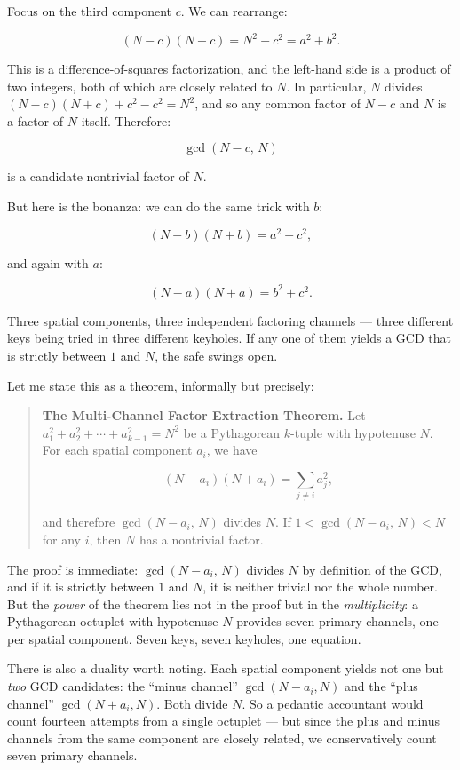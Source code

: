 Focus on the third component \(c\). We can rearrange:

\[(N - c)(N + c) = N^2 - c^2 = a^2 + b^2.\]

This is a difference-of-squares factorization, and the left-hand side is a product of two integers, both of which are closely related to \(N\). In particular, \(N\) divides \((N - c)(N + c) + c^2 - c^2 = N^2\), and so any common factor of \(N - c\) and \(N\) is a factor of \(N\) itself. Therefore:

\[\gcd(N - c, \, N)\]

is a candidate nontrivial factor of \(N\).

But here is the bonanza: we can do the same trick with \(b\):

\[(N - b)(N + b) = a^2 + c^2,\]

and again with \(a\):

\[(N - a)(N + a) = b^2 + c^2.\]

Three spatial components, three independent factoring channels --- three different keys being tried in three different keyholes. If any one of them yields a GCD that is strictly between \(1\) and \(N\), the safe swings open.

Let me state this as a theorem, informally but precisely:

\begin{quote}
\textbf{The Multi-Channel Factor Extraction Theorem.} Let \(a_1^2 + a_2^2 + \cdots + a_{k-1}^2 = N^2\) be a Pythagorean \(k\)-tuple with hypotenuse \(N\). For each spatial component \(a_i\), we have

\[(N - a_i)(N + a_i) = \sum_{j \ne i} a_j^2,\]

and therefore \(\gcd(N - a_i, \, N)\) divides \(N\). If \(1 < \gcd(N - a_i, \, N) < N\) for any \(i\), then \(N\) has a nontrivial factor.
\end{quote}

The proof is immediate: \(\gcd(N - a_i, \, N)\) divides \(N\) by definition of the GCD, and if it is strictly between \(1\) and \(N\), it is neither trivial nor the whole number. But the \emph{power} of the theorem lies not in the proof but in the \emph{multiplicity}: a Pythagorean octuplet with hypotenuse \(N\) provides seven primary channels, one per spatial component. Seven keys, seven keyholes, one equation.

There is also a duality worth noting. Each spatial component yields not one but \emph{two} GCD candidates: the ``minus channel'' \(\gcd(N - a_i, N)\) and the ``plus channel'' \(\gcd(N + a_i, N)\). Both divide \(N\). So a pedantic accountant would count fourteen attempts from a single octuplet --- but since the plus and minus channels from the same component are closely related, we conservatively count seven primary channels.


